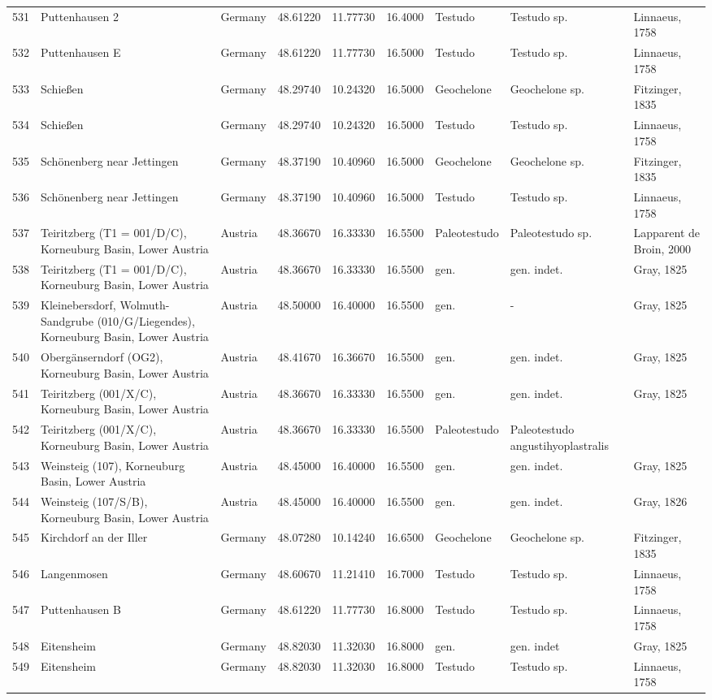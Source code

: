 \documentclass[]{article}
\begin{document}
\begin{longtable}[]{@{}lllrrrlll@{}}
531 & Puttenhausen 2 & Germany & 48.61220 & 11.77730 & 16.4000 & Testudo
& Testudo sp. & Linnaeus, 1758\tabularnewline
532 & Puttenhausen E & Germany & 48.61220 & 11.77730 & 16.5000 & Testudo
& Testudo sp. & Linnaeus, 1758\tabularnewline
533 & Schießen & Germany & 48.29740 & 10.24320 & 16.5000 & Geochelone &
Geochelone sp. & Fitzinger, 1835\tabularnewline
534 & Schießen & Germany & 48.29740 & 10.24320 & 16.5000 & Testudo &
Testudo sp. & Linnaeus, 1758\tabularnewline
535 & Schönenberg near Jettingen & Germany & 48.37190 & 10.40960 &
16.5000 & Geochelone & Geochelone sp. & Fitzinger, 1835\tabularnewline
536 & Schönenberg near Jettingen & Germany & 48.37190 & 10.40960 &
16.5000 & Testudo & Testudo sp. & Linnaeus, 1758\tabularnewline
537 & Teiritzberg (T1 = 001/D/C), Korneuburg Basin, Lower Austria &
Austria & 48.36670 & 16.33330 & 16.5500 & Paleotestudo & Paleotestudo
sp. & Lapparent de Broin, 2000\tabularnewline
538 & Teiritzberg (T1 = 001/D/C), Korneuburg Basin, Lower Austria &
Austria & 48.36670 & 16.33330 & 16.5500 & gen. & gen. indet. & Gray,
1825\tabularnewline
539 & Kleinebersdorf, Wolmuth-Sandgrube (010/G/Liegendes), Korneuburg
Basin, Lower Austria & Austria & 48.50000 & 16.40000 & 16.5500 & gen. &
- & Gray, 1825\tabularnewline
540 & Obergänserndorf (OG2), Korneuburg Basin, Lower Austria & Austria &
48.41670 & 16.36670 & 16.5500 & gen. & gen. indet. & Gray,
1825\tabularnewline
541 & Teiritzberg (001/X/C), Korneuburg Basin, Lower Austria & Austria &
48.36670 & 16.33330 & 16.5500 & gen. & gen. indet. & Gray,
1825\tabularnewline
542 & Teiritzberg (001/X/C), Korneuburg Basin, Lower Austria & Austria &
48.36670 & 16.33330 & 16.5500 & Paleotestudo & Paleotestudo
angustihyoplastralis &\tabularnewline
543 & Weinsteig (107), Korneuburg Basin, Lower Austria & Austria &
48.45000 & 16.40000 & 16.5500 & gen. & gen. indet. & Gray,
1825\tabularnewline
544 & Weinsteig (107/S/B), Korneuburg Basin, Lower Austria & Austria &
48.45000 & 16.40000 & 16.5500 & gen. & gen. indet. & Gray,
1826\tabularnewline
545 & Kirchdorf an der Iller & Germany & 48.07280 & 10.14240 & 16.6500 &
Geochelone & Geochelone sp. & Fitzinger, 1835\tabularnewline
546 & Langenmosen & Germany & 48.60670 & 11.21410 & 16.7000 & Testudo &
Testudo sp. & Linnaeus, 1758\tabularnewline
547 & Puttenhausen B & Germany & 48.61220 & 11.77730 & 16.8000 & Testudo
& Testudo sp. & Linnaeus, 1758\tabularnewline
548 & Eitensheim & Germany & 48.82030 & 11.32030 & 16.8000 & gen. & gen.
indet & Gray, 1825\tabularnewline
549 & Eitensheim & Germany & 48.82030 & 11.32030 & 16.8000 & Testudo &
Testudo sp. & Linnaeus, 1758\tabularnewline

\end{longtable}
\end{document}
